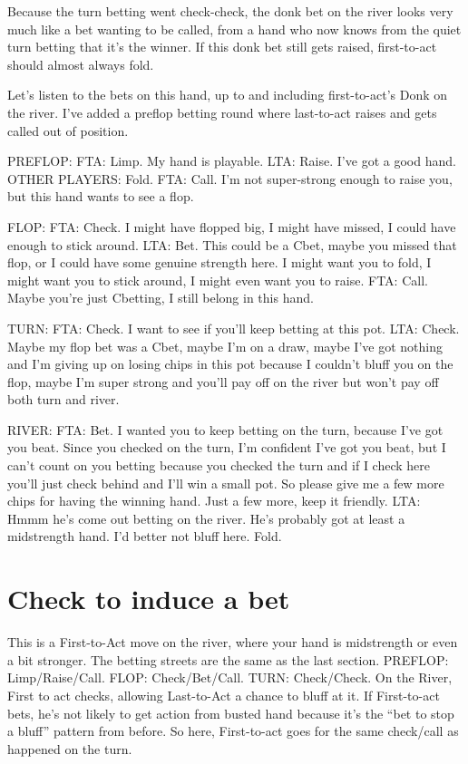 Because the turn betting went check-check, the donk bet
on the river looks very much like a bet wanting to be called,
from a hand who now knows from the quiet turn betting that it's
the winner. If this donk bet still gets raised, first-to-act
should almost always fold.

Let's listen to the bets on this hand, up to and including
first-to-act's Donk on the river. I've added a preflop betting
round where last-to-act raises and gets called out of position.

PREFLOP: FTA: Limp. My hand is playable. LTA: Raise. I've got a good
hand. OTHER PLAYERS: Fold. FTA: Call. I'm not super-strong enough to
raise you, but this hand wants to see a flop.

FLOP: FTA: Check. I might have flopped big, I might have missed, I
could have enough to stick around. LTA: Bet. This could be
a Cbet, maybe you missed that flop, or I could have some genuine
strength here. I might want you to fold, I might want you to stick
around, I might even want you to raise. FTA: Call. Maybe you're just
Cbetting, I still belong in this hand.

TURN: FTA: Check. I want to see if you'll keep betting at this pot.
LTA: Check. Maybe my flop bet was a Cbet, maybe I'm on a draw, maybe
I've got nothing and I'm giving up on losing chips in this pot because
I couldn't bluff you on the flop, maybe I'm super strong and you'll
pay off on the river but won't pay off both turn and river.

RIVER: FTA: Bet. I wanted you to keep betting on the turn, because
I've got you beat. Since you checked on the turn, I'm confident I've
got you beat, but I can't count on you betting because you checked the
turn and if I check here you'll just check behind and I'll win a small
pot. So please give me a few more chips for having the winning
hand. Just a few more, keep it friendly. LTA: Hmmm he's come out betting
on the river. He's probably got at least a midstrength hand. I'd better
not bluff here. Fold.

\section{Check to induce a bet}

This is a First-to-Act move on the river, where your hand is
midstrength or even a bit stronger. The betting streets are the
same as the last section. PREFLOP: Limp/Raise/Call. FLOP:
Check/Bet/Call. TURN: Check/Check. On the River, First to act checks,
allowing Last-to-Act a chance to bluff at it. If First-to-act bets,
he's not likely to get action from busted hand because it's the
``bet to stop a bluff'' pattern from before. So here, First-to-act
goes for the same check/call as happened on the turn.

